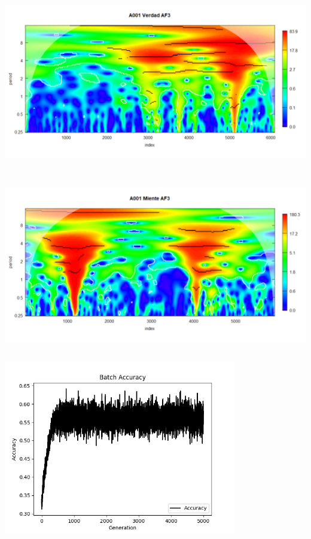 \begin{center}
\includegraphics[height=3.0in]{figuras/Imagen9.png}
\end{center}

\begin{center}
\includegraphics[height=3.0in]{figuras/Imagen10.png}
\end{center}



\begin{center}
\includegraphics[height=3.0in]{figuras/Figure_1.png}
\end{center}

